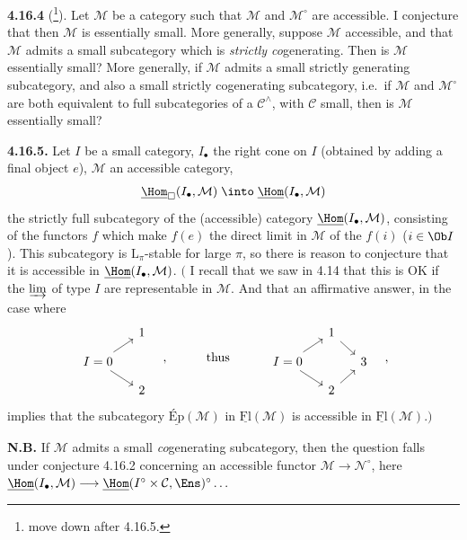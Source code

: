 
\textbf{4.16.4} (\footnote[194]{move down after 4.16.5.}). Let $\mathcal{M}$ be a category such that $\mathcal{M}$ and $\mathcal{M}^\circ$ are accessible. I conjecture that then $\mathcal{M}$ is essentially small. More generally, suppose $\mathcal{M}$ accessible, and that $\mathcal{M}$ admits a small subcategory which is \textit{strictly co}generating. Then is $\mathcal{M}$ essentially small? More generally, if $\mathcal{M}$ admits a small strictly generating subcategory, and also a small strictly cogenerating subcategory, i.e.\ if $\mathcal{M}$ and $\mathcal{M}^\circ$ are both equivalent to full subcategories of a $\mathcal{C}^\wedge$, with $\mathcal{C}$ small, then is $\mathcal{M}$ essentially small?

\textbf{4.16.5.} Let $I$ be a small category, $I_\bullet$ the right cone on $I$ (obtained by adding a final object $e$), $\mathcal{M}$ an accessible category,
\[
\underline{\Hom}_{\square}(I_\bullet,\mathcal{M}) \;\into\; \underline{\Hom}(I_\bullet,\mathcal{M})
\]
the strictly full subcategory of the (accessible) category $\underline{\Hom}(I_\bullet,\mathcal{M})$, consisting of the functors $f$ which make $f(e)$ the direct limit in $\mathcal{M}$ of the $f(i)$ ($i \in \Ob I$). This subcategory is $\mathrm{L}_\pi$-stable for large $\pi$, so there is reason
to conjecture that it is accessible in $\underline{\Hom}(I_\bullet,\mathcal{M})$. $\Big($ I recall that we saw in 4.14 that this is OK if the $\varinjlim$ of type $I$ are representable in $\mathcal{M}$. And that an affirmative answer, in the case where
\[
\begin{tikzcd}[row sep=small, column sep=small]
 & 1 \\
I = 0 \arrow[ur] \arrow[dr] & \\
 & 2
\end{tikzcd}
\quad ,\qquad\quad \text{thus} \qquad\quad
\begin{tikzcd}[row sep=small, column sep=small]
 & 1 \arrow[dr] & \\
I = 0 \arrow[ur] \arrow[dr] & & 3 \\
 & 2 \arrow[ur] &
\end{tikzcd}
\quad ,
\]
implies that the subcategory $\underline{\text{Ép}}(\mathcal{M})$ in $\underline{\mathrm{Fl}}(\mathcal{M})$ is accessible in $\underline{\mathrm{Fl}}(\mathcal{M})$.$\Big)$

\textbf{N.B.} If $\mathcal{M}$ admits a small \textit{co}generating subcategory, then the question falls under conjecture 4.16.2 concerning an accessible functor $\mathcal{M} \longrightarrow \mathcal{N}^\circ$, here $\underline{\Hom}(I_\bullet,\mathcal{M}) \longrightarrow \underline{\Hom}(I^\circ \times \mathcal{C},\Ens)^\circ \dots$

